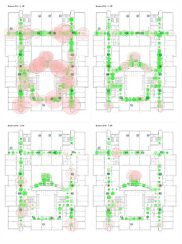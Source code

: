 \begin{figure}[h!]
	\begin{centering}
		\includegraphics[width=0.4\textwidth]{img/combined_error_classic}
		\includegraphics[width=0.4\textwidth]{img/combined_error_multiple_f}
		\includegraphics[width=0.4\textwidth]{img/combined_error_f_combination}
		\includegraphics[width=0.4\textwidth]{img/phone_error}

\end{centering}
\end{figure}
